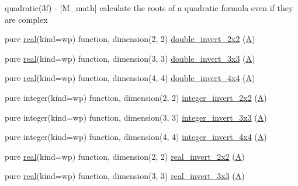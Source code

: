 \begin{DoxyCompactItemize}
\begin{DoxyCompactList}
quadratic(3f) -\/ \mbox{[}M\+\_\+math\mbox{]} calculate the roots of a quadratic formula even if they are complex \end{DoxyCompactList}\item 
pure \hyperlink{read__watch_83_8txt_abdb62bde002f38ef75f810d3a905a823}{real}(kind=wp) function, dimension(2, 2) \hyperlink{namespacem__math_ae65562df2e78e7ebc0660a8f8b3a4030}{double\+\_\+invert\+\_\+2x2} (\hyperlink{ufpp__overview_81_8txt_a8341271e5f4e3003f6eb1c9547fc9d1a}{A})
\item 
pure \hyperlink{read__watch_83_8txt_abdb62bde002f38ef75f810d3a905a823}{real}(kind=wp) function, dimension(3, 3) \hyperlink{namespacem__math_a7ff8d2485bffbbe9fce3e13d62a19677}{double\+\_\+invert\+\_\+3x3} (\hyperlink{ufpp__overview_81_8txt_a8341271e5f4e3003f6eb1c9547fc9d1a}{A})
\item 
pure \hyperlink{read__watch_83_8txt_abdb62bde002f38ef75f810d3a905a823}{real}(kind=wp) function, dimension(4, 4) \hyperlink{namespacem__math_a258a8a014e105b40c2653d3036e7ddb6}{double\+\_\+invert\+\_\+4x4} (\hyperlink{ufpp__overview_81_8txt_a8341271e5f4e3003f6eb1c9547fc9d1a}{A})
\item 
pure integer(kind=wp) function, dimension(2, 2) \hyperlink{namespacem__math_abccb5c1bfc17724aca07448be7b1d2c8}{integer\+\_\+invert\+\_\+2x2} (\hyperlink{ufpp__overview_81_8txt_a8341271e5f4e3003f6eb1c9547fc9d1a}{A})
\item 
pure integer(kind=wp) function, dimension(3, 3) \hyperlink{namespacem__math_aa8aaf1df6257440a637e51922f2d482f}{integer\+\_\+invert\+\_\+3x3} (\hyperlink{ufpp__overview_81_8txt_a8341271e5f4e3003f6eb1c9547fc9d1a}{A})
\item 
pure integer(kind=wp) function, dimension(4, 4) \hyperlink{namespacem__math_a4bd503fea27968c6b3d7ab2a71509db7}{integer\+\_\+invert\+\_\+4x4} (\hyperlink{ufpp__overview_81_8txt_a8341271e5f4e3003f6eb1c9547fc9d1a}{A})
\item 
pure \hyperlink{read__watch_83_8txt_abdb62bde002f38ef75f810d3a905a823}{real}(kind=wp) function, dimension(2, 2) \hyperlink{namespacem__math_aa8b68ce8fb1a10c992e769f2e042979e}{real\+\_\+invert\+\_\+2x2} (\hyperlink{ufpp__overview_81_8txt_a8341271e5f4e3003f6eb1c9547fc9d1a}{A})
\item 
pure \hyperlink{read__watch_83_8txt_abdb62bde002f38ef75f810d3a905a823}{real}(kind=wp) function, dimension(3, 3) \hyperlink{namespacem__math_a79f32ff4d35916ca4422bb8ce0d30113}{real\+\_\+invert\+\_\+3x3} (\hyperlink{ufpp__overview_81_8txt_a8341271e5f4e3003f6eb1c9547fc9d1a}{A})
\item 

\end{DoxyCompactItemize}
